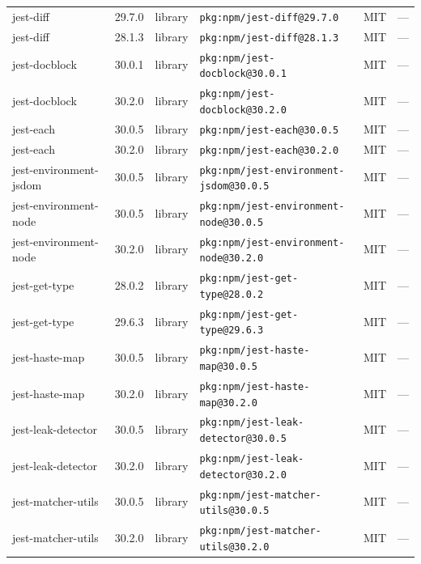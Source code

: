 \documentclass[11pt,a4paper]{article}
\begin{document}
\begin{longtable}{|p{4cm}|p{2cm}|p{1.6cm}|p{5cm}|p{1.5cm}|p{3.5cm}|}
\raggedright jest-diff & 29.7.0 & library & \small\texttt{pkg:npm/jest-diff@29.7.0} & MIT & \small — \\
\raggedright jest-diff & 28.1.3 & library & \small\texttt{pkg:npm/jest-diff@28.1.3} & MIT & \small — \\
\raggedright jest-docblock & 30.0.1 & library & \small\texttt{pkg:npm/jest-docblock@30.0.1} & MIT & \small — \\
\raggedright jest-docblock & 30.2.0 & library & \small\texttt{pkg:npm/jest-docblock@30.2.0} & MIT & \small — \\
\raggedright jest-each & 30.0.5 & library & \small\texttt{pkg:npm/jest-each@30.0.5} & MIT & \small — \\
\raggedright jest-each & 30.2.0 & library & \small\texttt{pkg:npm/jest-each@30.2.0} & MIT & \small — \\
\raggedright jest-environment-jsdom & 30.0.5 & library & \small\texttt{pkg:npm/jest-environment-jsdom@30.0.5} & MIT & \small — \\
\raggedright jest-environment-node & 30.0.5 & library & \small\texttt{pkg:npm/jest-environment-node@30.0.5} & MIT & \small — \\
\raggedright jest-environment-node & 30.2.0 & library & \small\texttt{pkg:npm/jest-environment-node@30.2.0} & MIT & \small — \\
\raggedright jest-get-type & 28.0.2 & library & \small\texttt{pkg:npm/jest-get-type@28.0.2} & MIT & \small — \\
\raggedright jest-get-type & 29.6.3 & library & \small\texttt{pkg:npm/jest-get-type@29.6.3} & MIT & \small — \\
\raggedright jest-haste-map & 30.0.5 & library & \small\texttt{pkg:npm/jest-haste-map@30.0.5} & MIT & \small — \\
\raggedright jest-haste-map & 30.2.0 & library & \small\texttt{pkg:npm/jest-haste-map@30.2.0} & MIT & \small — \\
\raggedright jest-leak-detector & 30.0.5 & library & \small\texttt{pkg:npm/jest-leak-detector@30.0.5} & MIT & \small — \\
\raggedright jest-leak-detector & 30.2.0 & library & \small\texttt{pkg:npm/jest-leak-detector@30.2.0} & MIT & \small — \\
\raggedright jest-matcher-utils & 30.0.5 & library & \small\texttt{pkg:npm/jest-matcher-utils@30.0.5} & MIT & \small — \\
\raggedright jest-matcher-utils & 30.2.0 & library & \small\texttt{pkg:npm/jest-matcher-utils@30.2.0} & MIT & \small — \\

\end{longtable}
\end{document}
